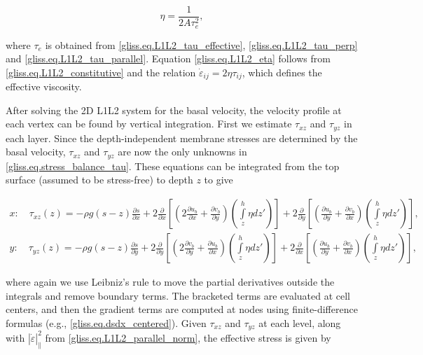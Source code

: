 {\begin{equation}
  \label{gliss.eq.L1L2_eta}
  \eta  = \frac{1}{2A \tau_{e}^{2}},
\end{equation}

\noindent
where $\tau_{e}$ is obtained from \eqref{gliss.eq.L1L2_tau_effective},
\eqref{gliss.eq.L1L2_tau_perp} and \eqref{gliss.eq.L1L2_tau_parallel}.
Equation \eqref{gliss.eq.L1L2_eta} follows from \eqref{gliss.eq.L1L2_constitutive}
and the relation ${\dot{\varepsilon }}_{ij} = 2\eta {\tau }_{ij}$, which defines
the effective viscosity.

After solving the 2D L1L2 system for the basal velocity, the velocity profile at each vertex
can be found by vertical integration. First we estimate
$\tau_{xz}$ and $\tau_{yz}$ in each layer.  Since the depth-independent membrane stresses
are determined by the basal velocity, $\tau_{xz}$ and $\tau_{yz}$ are now the
only unknowns in \eqref{gliss.eq.stress_balance_tau}.  These equations can be integrated
from the top surface (assumed to be stress-free) to depth $z$ to give

\begin{equation}
  \begin{split}
    x: \quad {{\tau }_{xz}}(z) = -\rho g(s-z)\frac{\partial s}{\partial x} 
    + 2\frac{\partial }{\partial x}\left[ \left( 2\frac{\partial {{u}_{b}}}{\partial x}+\frac{\partial {{v}_{b}}}{\partial y} \right)
      \left( \int\limits_{z}^{h}{\eta d{z}'} \right) \right] 
    + 2\frac{\partial }{\partial y}\left[ \left(  \frac{\partial {{u}_{b}}}{\partial y}+\frac{\partial {{v}_{b}}}{\partial x} \right)
      \left( \int\limits_{z}^{h}{\eta d{z}'} \right) \right], \\
    y: \quad {{\tau }_{yz}}(z) = -\rho g(s-z)\frac{\partial s}{\partial y} 
    + 2\frac{\partial }{\partial y}\left[ \left( 2\frac{\partial {{v}_{b}}}{\partial y}+\frac{\partial {{u}_{b}}}{\partial x} \right)
      \left( \int\limits_{z}^{h}{\eta d{z}'} \right) \right] 
    + 2\frac{\partial }{\partial x}\left[ \left(  \frac{\partial {{u}_{b}}}{\partial y}+\frac{\partial {{v}_{b}}}{\partial x} \right)
      \left( \int\limits_{z}^{h}{\eta d{z}'} \right) \right],
  \end{split}
\end{equation}

\noindent
where again we use Leibniz's rule to move the partial derivatives outside the integrals
and remove boundary terms.
The bracketed terms are evaluated at cell centers, and then the gradient terms are 
computed at nodes using finite-difference formulas (e.g., \eqref{gliss.eq.dsdx_centered}).
Given $\tau_{xz}$ and $\tau_{yz}$ at each level, along with
$\left| \dot{\varepsilon } \right|_{\parallel }^{2}$ from \eqref{gliss.eq.L1L2_parallel_norm},
the effective stress is given by

}
